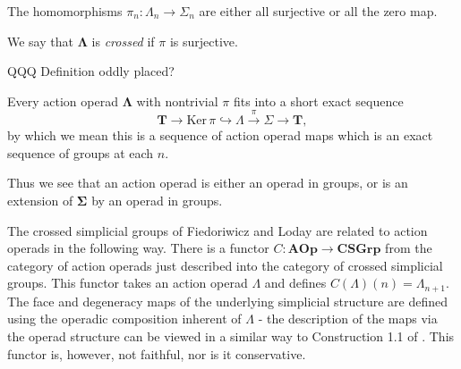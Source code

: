 \documentclass{amsbook} %
\newcommand{\mb}{\mathbf}
\newcommand{\ML}{\mathbf{\Lambda}}
\numberwithin{section}{chapter}
\begin{document}
\begin{prop}\label{zero/surj}
The homomorphisms $\pi_n : \Lambda_n \to \Sigma_n$ are either all surjective or all the zero map.
\end{prop}

\begin{Defi} 
We say that $\ML$ is \emph{crossed} if $\pi$ is surjective.
\end{Defi}
QQQ Definition oddly placed?
\begin{cor}\label{extension}
Every action operad $\ML$ with nontrivial $\pi$ fits into a short exact sequence
\[
\mb{T}\to \textrm{Ker}\,\pi \hookrightarrow \Lambda \stackrel{\pi}{\longrightarrow} \Sigma \to \mb{T},
\]
by which we mean this is a sequence of action operad maps which is an exact sequence of groups at each $n$.
\end{cor}

\begin{rem}
Thus we see that an action operad is either an operad in groups, or is an extension of $\mb{\Sigma}$ by an operad in groups.
\end{rem}

\begin{rem}
The crossed simplicial groups of Fiedoriwicz and Loday \cite{FL91} are related to action operads in the following way. There is a functor $C \colon \mathbf{AOp} \rightarrow \mathbf{CSGrp}$ from the category of action operads just described into the category of crossed simplicial groups. This functor takes an action operad $\Lambda$ and defines $C(\Lambda)(n) = \Lambda_{n+1}$. The face and degeneracy maps of the underlying simplicial structure are defined using the operadic composition inherent of $\Lambda$ - the description of the maps via the operad structure can be viewed in a similar way to Construction 1.1 of \cite{Kra96}. This functor is, however, not faithful, nor is it conservative.
\end{rem}
\end{document}
